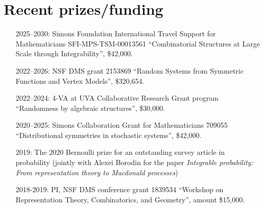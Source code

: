 \documentclass[letterpaper,11pt]{article}
\begin{document}
\section*{Recent prizes/funding}
\begin{itemize}
	\item [2025--2030:]
	Simons Foundation International Travel Support for Mathematicians SFI-MPS-TSM-00013561
	``Combinatorial Structures at Large Scale through Integrability'',
	\$42,000.

	\item [2022--2026:]
	NSF DMS grant 2153869
	``Random Systems from Symmetric Functions and Vertex Models'',
	\$320,654.

	\item [2022--2024:]
	4-VA at UVA Collaborative Research Grant program
	``Randomness by algebraic structures'',
	\$30,000.


	\item [2020--2025:]
		Simons Collaboration Grant for Mathematicians 709055
		``Distributional symmetries in stochastic systems'',
		\$42,000.
	\item [2019:]
		The 2020 Bernoulli prize for an outstanding survey article in probability
		(jointly with Alexei Borodin for the paper \emph{Integrable probability: From representation theory to
		Macdonald processes})
	\item
		[2018-2019:] PI,
				NSF DMS conference grant
				1839534
				``Workshop on Representation Theory, Combinatorics, and Geometry'',
				amount \$15,000.



\end{itemize}
\end{document}
